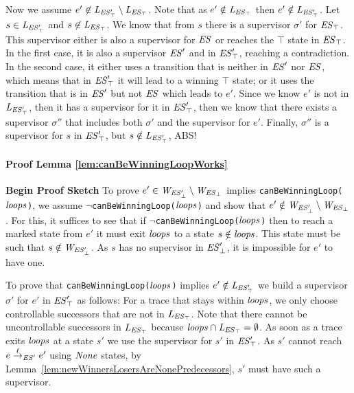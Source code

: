 Now we assume $e' \not\in 
\mathit{L_{\mathit{\mathit{ES}'_{\top}}}} \setminus \mathit{L_{\mathit{\mathit{ES}_{\top}}}}$. Note that as $e' \notin \mathit{L_{\mathit{\mathit{ES}_{\top}}}}$ then $e' 
\notin 
\mathit{L_{\mathit{\mathit{ES}'_{\top}}}}$.  
 Let $s \in \mathit{L_{\mathit{\mathit{ES}'_{\top}}}}$ and $s \not\in \mathit{L_{\mathit{\mathit{ES}_{\top}}}}$. We know that from $s$ 
 there is a supervisor $\sigma'$ for 
 $\mathit{\mathit{ES}_{\top}}$. This supervisor either is also a 
 supervisor for $\mathit{ES}$ or reaches the $\top$ state in 
 $\mathit{\mathit{ES}_{\top}}$. In the first case, it is also a 
 supervisor $\mathit{ES}'$ and in $\mathit{\mathit{ES}'_{\top}}$, 
 reaching a contradiction. In the second case, it either uses a 
 transition that is neither in $\mathit{ES}'$ nor $\mathit{ES}$, which 
 means that in $\mathit{\mathit{ES}'_{\top}}$ it will lead to a 
 winning $\top$ state; or it uses the transition that is in 
 $\mathit{ES}'$ but not $\mathit{ES}$ which leads to $e'$. Since we 
 know $e'$ is not in $\mathit{L_{\mathit{\mathit{ES}'_{\top}}}}$, then it has a supervisor for it in 
 $\mathit{\mathit{ES}'_{\top}}$, then we know that there exists a 
 supervisor $\sigma''$ that includes both $\sigma'$ and the 
 supervisor for $e'$. Finally, $\sigma''$ is a supervisor for $s$ in 
 $\mathit{\mathit{ES}'_{\top}}$, but $s \notin \mathit{L_{\mathit{\mathit{ES}'_{\top}}}}$, ABS!	



\paragraph*{Proof Lemma \ref{lem:canBeWinningLoopWorks}}
\textbf{{Begin Proof Sketch}}
To prove $e' \in \mathit{W_{\mathit{\mathit{ES}'_{\bot}}}} \setminus \mathit{W_{\mathit{\mathit{ES}_{\bot}}}}$ implies  \texttt{canBeWinningLoop($\mathit{loops}$)}, we  
assume $\neg$\texttt{canBeWinningLoop($\mathit{loops}$)} and show that $e' \notin \mathit{W_{\mathit{\mathit{ES}'_{\bot}}}} 
\setminus \mathit{W_{\mathit{\mathit{ES}_{\bot}}}}$. For this, it suffices to see that if 
$\neg$\texttt{canBeWinningLoop($\mathit{loops}$)} then to reach a marked state from $e'$ it must 
exit $\mathit{loops}$ to a state $s \notin \mathit{loops}$. This state must be such that $s \notin \mathit{W_{\mathit{\mathit{ES}'_{\bot}}}}$. As 
$s$ has no 
supervisor in $\mathit{\mathit{ES}'_{\bot}}$, it is impossible for $e'$ to have one. 


To prove that \texttt{canBeWinningLoop($\mathit{loops}$)} implies $e' \notin \mathit{L_{\mathit{\mathit{ES}'_{\top}}}}$ we build a supervisor $\sigma'$ for $e'$ in $\mathit{\mathit{ES}'_{\top}}$ as 
follows: 
For a trace that stays within $\mathit{loops}$, we only choose controllable successors 
that are not 
in $\mathit{L_{\mathit{\mathit{ES}_{\top}}}}$. Note that there cannot be uncontrollable successors in $\mathit{L_{\mathit{\mathit{ES}_{\top}}}}$ because 
$\mathit{loops} \cap \mathit{L_{\mathit{\mathit{ES}_{\top}}}}= \emptyset$.   As soon as a trace exits $\mathit{loops}$ at a state $s'$ we 
use the supervisor for $s'$ in $\mathit{\mathit{ES}'_{\top}}$. 
As $s'$ cannot reach $e \overset{\ell}{\rightarrow}_{\mathit{ES}'} 
e'$ using $\mathit{None}$ states, by 
Lemma~\ref{lem:newWinnersLosersAreNonePredecessors}, $s'$ must have such a 
supervisor. 

